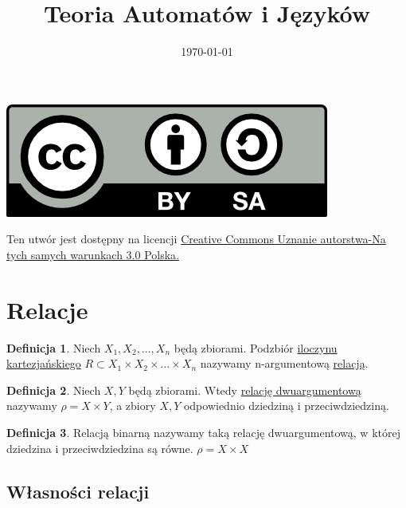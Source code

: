\documentclass[12pt,a4paper]{article}
\theoremstyle{definition}
\newtheorem{df}{Definicja}
\theoremstyle{remark}
\begin{document}
\title{ Teoria Automatów i Języków}
\author{\vspace{-5ex}}
\date{\today}
\maketitle
\tableofcontents

\begin{center}
\leavevmode

\vfill

\includegraphics[width=1 in]{by-sa.png}
\end{center}
\label{fig:cc}
\scriptsize{Ten utwór jest dostępny na licencji  
\href{http://creativecommons.org/licenses/by-sa/3.0/pl/}{Creative Commons Uznanie autorstwa-Na tych samych warunkach 3.0 Polska.}}

\pagebreak

\section{Relacje}

\begin{df}
Niech $X_1, X_2, \dots, X_n$ będą zbiorami. Podzbiór \href{http://pl.wikipedia.org/wiki/Iloczyn_kartezja%C5%84ski}{iloczynu kartezjańskiego} 
$R \subset X_1 \times X_2 \times \dots \times X_n$ 
nazywamy n-argumentową \href{http://pl.wikipedia.org/wiki/Relacja_(matematyka)}{relacją}. 
\end{df}

\begin{df}
Niech $X, Y$ będą zbiorami. Wtedy \href{http://pl.wikipedia.org/wiki/Relacja_dwuargumentowa}{relację dwuargumentową} nazywamy $\rho = X \times Y$, a zbiory $X, Y$ odpowiednio dziedziną i przeciwdziedziną.  
\end{df}

\begin{df}
Relacją binarną nazywamy taką relację dwuargumentową,
w której dziedzina i przeciwdziedzina są równe. $\rho = X \times X$
\end{df}

\subsection{Własności relacji}
\end{document}
